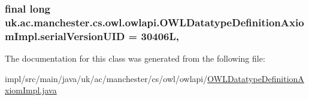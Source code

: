 \hypertarget{classuk_1_1ac_1_1manchester_1_1cs_1_1owl_1_1owlapi_1_1_o_w_l_datatype_definition_axiom_impl_abe0ca36630145d416f2bf147112bb9da}{
\subsubsection[{serial\-Version\-U\-I\-D}]{\setlength{\rightskip}{0pt plus 5cm}final long uk.\-ac.\-manchester.\-cs.\-owl.\-owlapi.\-O\-W\-L\-Datatype\-Definition\-Axiom\-Impl.\-serial\-Version\-U\-I\-D = 30406\-L\hspace{0.3cm}{\ttfamily [static]}, {\ttfamily [private]}}}\label{classuk_1_1ac_1_1manchester_1_1cs_1_1owl_1_1owlapi_1_1_o_w_l_datatype_definition_axiom_impl_abe0ca36630145d416f2bf147112bb9da}


The documentation for this class was generated from the following file\-:\begin{DoxyCompactItemize}
\item 
impl/src/main/java/uk/ac/manchester/cs/owl/owlapi/\hyperlink{_o_w_l_datatype_definition_axiom_impl_8java}{O\-W\-L\-Datatype\-Definition\-Axiom\-Impl.\-java}\end{DoxyCompactItemize}

